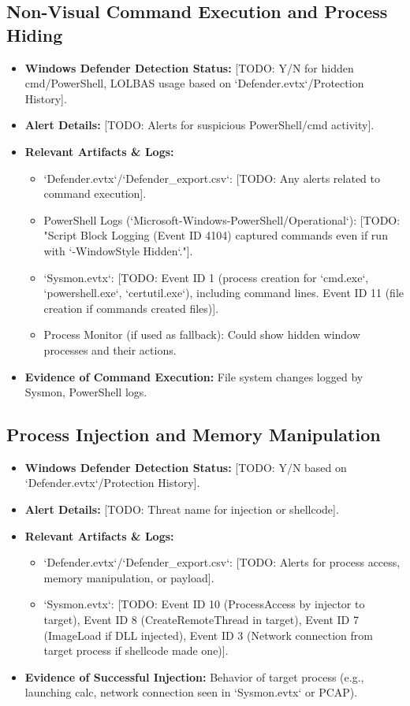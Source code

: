 \documentclass[11pt]{article}
\begin{document}
	\subsection{Non-Visual Command Execution and Process Hiding}
	\begin{itemize}
		\item \textbf{Windows Defender Detection Status:} [TODO: Y/N for hidden cmd/PowerShell, LOLBAS usage based on `Defender.evtx`/Protection History].
		\item \textbf{Alert Details:} [TODO: Alerts for suspicious PowerShell/cmd activity].
		\item \textbf{Relevant Artifacts & Logs:}
		\begin{itemize}
			\item `Defender.evtx`/`Defender_export.csv`: [TODO: Any alerts related to command execution].
			\item PowerShell Logs (`Microsoft-Windows-PowerShell/Operational`): [TODO: "Script Block Logging (Event ID 4104) captured commands even if run with `-WindowStyle Hidden`."].
			\item `Sysmon.evtx`: [TODO: Event ID 1 (process creation for `cmd.exe`, `powershell.exe`, `certutil.exe`), including command lines. Event ID 11 (file creation if commands created files)].
			\item Process Monitor (if used as fallback): Could show hidden window processes and their actions.
		\end{itemize}
		\item \textbf{Evidence of Command Execution:} File system changes logged by Sysmon, PowerShell logs.
	\end{itemize}
	
	\subsection{Process Injection and Memory Manipulation}
	\begin{itemize}
		\item \textbf{Windows Defender Detection Status:} [TODO: Y/N based on `Defender.evtx`/Protection History].
		\item \textbf{Alert Details:} [TODO: Threat name for injection or shellcode].
		\item \textbf{Relevant Artifacts & Logs:}
		\begin{itemize}
			\item `Defender.evtx`/`Defender_export.csv`: [TODO: Alerts for process access, memory manipulation, or payload].
			\item `Sysmon.evtx`: [TODO: Event ID 10 (ProcessAccess by injector to target), Event ID 8 (CreateRemoteThread in target), Event ID 7 (ImageLoad if DLL injected), Event ID 3 (Network connection from target process if shellcode made one)].
		\end{itemize}
		\item \textbf{Evidence of Successful Injection:} Behavior of target process (e.g., launching calc, network connection seen in `Sysmon.evtx` or PCAP).
	\end{itemize}
	
\end{document}
